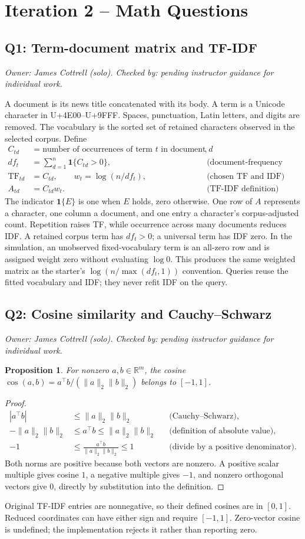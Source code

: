 \documentclass[11pt]{article}
\newtheorem{proposition}{Proposition}
\newcommand{\R}{\mathbb{R}}
\newcommand{\ownership}{\smallskip\textit{Owner: James Cottrell (solo).
Checked by: pending instructor guidance for individual work.}\par\smallskip}
\begin{document}
\clearpage
\section{Iteration 2 -- Math Questions}
\subsection{Q1: Term-document matrix and TF-IDF}
\ownership
A document is its news title concatenated with its body. A term is a Unicode
character in U+4E00--U+9FFF. Spaces, punctuation, Latin letters, and digits are
removed. The vocabulary is the sorted set of retained characters observed in the
selected corpus. Define
\begin{align}
C_{td}&=\text{number of occurrences of term $t$ in document $d$},\\
df_t&=\sum_{d=1}^{n}\mathbf1\{C_{td}>0\},
&&\text{(document-frequency definition)}\\
\operatorname{TF}_{td}&=C_{td},\qquad w_t=\log(n/df_t),
&&\text{(chosen TF and IDF)}\\
A_{td}&=C_{td}w_t.
&&\text{(TF-IDF definition)}
\end{align}
The indicator $\mathbf1\{E\}$ is one when $E$ holds, zero otherwise. One row of
$A$ represents a character, one column a document, and one entry a character's
corpus-adjusted count. Repetition raises TF, while occurrence across many
documents reduces IDF. A retained corpus term has $df_t>0$; a universal term has
IDF zero. In the simulation, an unobserved fixed-vocabulary term is an all-zero
row and is assigned weight zero without evaluating $\log0$. This produces the
same weighted matrix as the starter's $\log(n/\max(df_t,1))$ convention.
Queries reuse the fitted vocabulary and IDF; they never refit IDF on the query.

\subsection{Q2: Cosine similarity and Cauchy--Schwarz}
\ownership
\begin{proposition}
For nonzero $a,b\in\R^m$, the cosine
$\operatorname{cos}(a,b)=a^\top b/(\|a\|_2\|b\|_2)$ belongs to $[-1,1]$.
\end{proposition}
\begin{proof}
\begin{align*}
|a^\top b|&\le\|a\|_2\|b\|_2 &&\text{(Cauchy--Schwarz)},\\
-\|a\|_2\|b\|_2&\le a^\top b\le\|a\|_2\|b\|_2
&&\text{(definition of absolute value)},\\
-1&\le\frac{a^\top b}{\|a\|_2\|b\|_2}\le1
&&\text{(divide by a positive denominator)}.
\end{align*}
Both norms are positive because both vectors are nonzero. A positive scalar
multiple gives cosine $1$, a negative multiple gives $-1$, and nonzero orthogonal
vectors give $0$, directly by substitution into the definition.
\end{proof}
Original TF-IDF entries are nonnegative, so their defined cosines are in $[0,1]$.
Reduced coordinates can have either sign and require $[-1,1]$. Zero-vector cosine
is undefined; the implementation rejects it rather than reporting zero.
\end{document}
